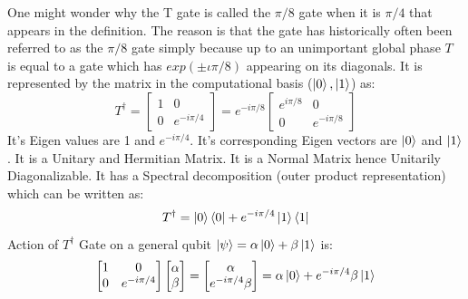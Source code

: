 One might wonder why the T gate is called the $\pi/8$ gate when it is $\pi/4$ that appears in the definition. The reason is that the gate has historically often been referred to as the $\pi/8$ gate simply because up to an unimportant global phase $T$ is equal to a gate which has $exp(\pm \iota \pi/8)$ appearing on its diagonals. It is represented by the matrix in the computational basis ($\ket{0},\ket{1}$) as:
\[
    T^{\dagger}=\begin{bmatrix}
        1 & 0 \\
        0 & e^{-i\pi/4}
    \end{bmatrix}=e^{-i\pi/8}\begin{bmatrix}
        e^{i\pi/8} & 0 \\
        0 & e^{-i\pi/8}
    \end{bmatrix}
\]
It's Eigen values are 1 and $e^{-i\pi/4}$. It's corresponding Eigen vectors are $\ket{0}$ and $\ket{1}$.
It is a Unitary and Hermitian Matrix. It is a Normal Matrix hence Unitarily Diagonalizable.
It has a Spectral decomposition (outer product representation) which can be written as:
\[
    T^{\dagger}=\ket{0}\bra{0}+e^{-i\pi/4}\ket{1}\bra{1}
\]
Action of $T^{\dagger}$ Gate on a general qubit $\ket{\psi}=\alpha\ket{0}+\beta\ket{1}$ is:
\[
    \begin{bmatrix}
        1 & 0 \\
        0 & e^{-i\pi/4}
    \end{bmatrix}\begin{bmatrix}
        \alpha \\
        \beta
    \end{bmatrix}=\begin{bmatrix}
        \alpha \\
        e^{-i\pi/4}\beta
    \end{bmatrix}=\alpha\ket{0}+e^{-i\pi/4}\beta\ket{1}
\]

